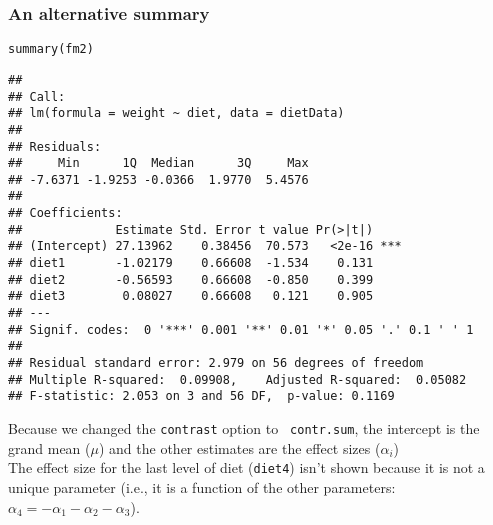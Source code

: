 \documentclass[color=usenames,dvipsnames]{beamer}\usepackage[]{graphicx}\usepackage[]{color}
\makeatletter
\newcommand{\hlstd}[1]{\textcolor[rgb]{0,0,0}{#1}}%
\newcommand{\hlkwd}[1]{\textcolor[rgb]{0.004,0.004,0.506}{#1}}%
\newenvironment{kframe}{%
 \def\at@end@of@kframe{}%
 \ifinner\ifhmode%
  \def\at@end@of@kframe{\end{minipage}}%
  \begin{minipage}{\columnwidth}%
 \fi\fi%
 \def\FrameCommand##1{\hskip\@totalleftmargin \hskip-\fboxsep
 \colorbox{shadecolor}{##1}\hskip-\fboxsep
     \hskip-\linewidth \hskip-\@totalleftmargin \hskip\columnwidth}%
 \MakeFramed {\advance\hsize-\width
   \@totalleftmargin\z@ \linewidth\hsize
   \@setminipage}}%
 {\par\unskip\endMakeFramed%
 \at@end@of@kframe}
\newenvironment{knitrout}{}{} %
\newcommand{\inr}[1]{\colorbox{inlinecolor}{\texttt{#1}}}
\makeatother
\begin{document}
\begin{frame}[fragile]
  \frametitle{An alternative summary}
  \scriptsize
\begin{knitrout}\tiny
{}\color{fgcolor}\begin{kframe}
\begin{alltt}
\hlkwd{summary}\hlstd{(fm2)}
\end{alltt}
\begin{verbatim}
## 
## Call:
## lm(formula = weight ~ diet, data = dietData)
## 
## Residuals:
##     Min      1Q  Median      3Q     Max 
## -7.6371 -1.9253 -0.0366  1.9770  5.4576 
## 
## Coefficients:
##             Estimate Std. Error t value Pr(>|t|)    
## (Intercept) 27.13962    0.38456  70.573   <2e-16 ***
## diet1       -1.02179    0.66608  -1.534    0.131    
## diet2       -0.56593    0.66608  -0.850    0.399    
## diet3        0.08027    0.66608   0.121    0.905    
## ---
## Signif. codes:  0 '***' 0.001 '**' 0.01 '*' 0.05 '.' 0.1 ' ' 1
## 
## Residual standard error: 2.979 on 56 degrees of freedom
## Multiple R-squared:  0.09908,	Adjusted R-squared:  0.05082 
## F-statistic: 2.053 on 3 and 56 DF,  p-value: 0.1169
\end{verbatim}
\end{kframe}
\end{knitrout}
\pause
\vfill
 {%
   Because we changed the \inr{contrast} option to {\tt
     contr.sum}, the intercept is the grand mean ($\mu$) and the other
   estimates are the effect sizes ($\alpha_i$) \\}
 \pause
 \vfill
 The effect size for the last level of diet ({\tt diet4}) isn't shown because it is not a unique parameter (i.e., it is a function of the other parameters: $\alpha_4 = -\alpha_1 - \alpha_2 - \alpha_3$). \\

\end{frame}
\end{document}
